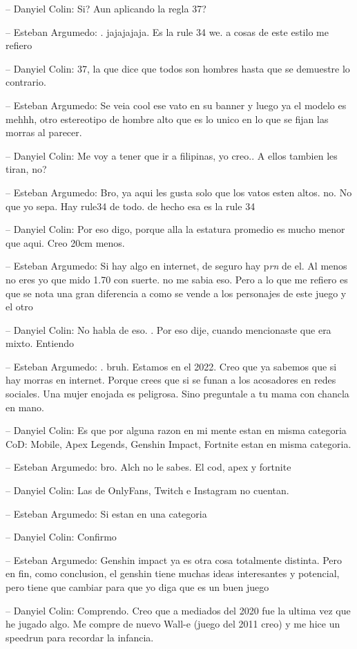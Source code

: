 -- Danyiel Colin: Si? Aun aplicando la regla 37?

-- Esteban Argumedo: . jajajajaja. Es la rule 34 we. a cosas de este
estilo me refiero

-- Danyiel Colin: 37, la que dice que todos son hombres hasta que se
demuestre lo contrario.

-- Esteban Argumedo: Se veia cool ese vato en su banner y luego ya el
modelo es mehhh, otro estereotipo de hombre alto que es lo unico en lo
que se fijan las morras al parecer.

-- Danyiel Colin: Me voy a tener que ir a filipinas, yo creo.. A ellos
tambien les tiran, no?

-- Esteban Argumedo: Bro, ya aqui les gusta solo que los vatos esten
altos. no. No que yo sepa. Hay rule34 de todo. de hecho esa es la rule
34

-- Danyiel Colin: Por eso digo, porque alla la estatura promedio es
mucho menor que aqui. Creo 20cm menos.

-- Esteban Argumedo: Si hay algo en internet, de seguro hay p\emph{rn}
de el. Al menos no eres yo que mido 1.70 con suerte. no me sabia eso.
Pero a lo que me refiero es que se nota una gran diferencia a como se
vende a los personajes de este juego y el otro

-- Danyiel Colin: No habla de eso. . Por eso dije, cuando mencionaste
que era mixto. Entiendo

-- Esteban Argumedo: . bruh. Estamos en el 2022. Creo que ya sabemos que
si hay morras en internet. Porque crees que si se funan a los acosadores
en redes sociales. Una mujer enojada es peligrosa. Sino preguntale a tu
mama con chancla en mano.

-- Danyiel Colin: Es que por alguna razon en mi mente estan en misma
categoria CoD: Mobile, Apex Legends, Genshin Impact, Fortnite estan en
misma categoria.

-- Esteban Argumedo: bro. Alch no le sabes. El cod, apex y fortnite

-- Danyiel Colin: Las de OnlyFans, Twitch e Instagram no cuentan.

-- Esteban Argumedo: Si estan en una categoria

-- Danyiel Colin: Confirmo

-- Esteban Argumedo: Genshin impact ya es otra cosa totalmente distinta.
Pero en fin, como conclusion, el genshin tiene muchas ideas interesantes
y potencial, pero tiene que cambiar para que yo diga que es un buen
juego

-- Danyiel Colin: Comprendo. Creo que a mediados del 2020 fue la ultima
vez que he jugado algo. Me compre de nuevo Wall-e (juego del 2011 creo)
y me hice un speedrun para recordar la infancia.

